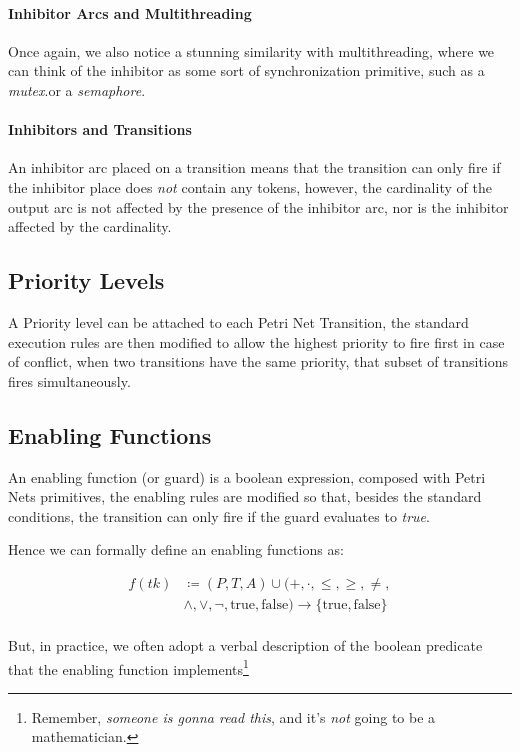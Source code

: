 \documentclass[openright, twoside, twocolumn, a4paper, 10pt]{report}
\begin{document}
\paragraph{Inhibitor Arcs and Multithreading}
Once again, we also notice a stunning similarity with multithreading, where we can think of the inhibitor
as some sort of synchronization primitive, such as a \emph{mutex}.or a \emph{semaphore}.

\paragraph{Inhibitors and Transitions}
An inhibitor arc placed on a transition means that the transition can only fire if the inhibitor place
does \emph{not} contain any tokens, however, the cardinality of the output arc is not affected by the
presence of the inhibitor arc, nor is the inhibitor affected by the cardinality.

\subsection{Priority Levels}

A Priority level can be attached to each Petri Net Transition, the standard execution rules are then modified
to allow the highest priority to fire first in case of conflict, when two transitions have the same priority,
that subset of transitions fires simultaneously.

\subsection{Enabling Functions}

An enabling function (or guard) is a boolean expression, composed with Petri Nets primitives, the enabling rules
are modified so that, besides the standard conditions, the transition can only fire if the guard evaluates to
\emph{true}.

Hence we can formally define an enabling functions as:

\begin{align*}
	f(tk) & \coloneqq (P, T, A) \cup (+, \cdot, \leq, \geq, \neq,                             \\
	      & \land, \lor, \neg, \text{true}, \text{false}) \to \{ \text{true}, \text{false} \} \\
\end{align*}

But, in practice, we often adopt a verbal description of the boolean predicate that the enabling function implements\footnote{%
	Remember, \emph{someone is gonna read this}, and it's \emph{not} going to be a mathematician.
}
\end{document}
